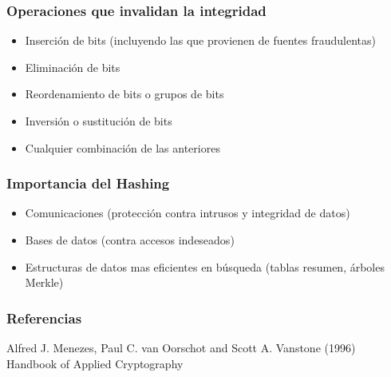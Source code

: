 \documentclass{beamer}
\begin{document}

\begin{frame}
\frametitle{Operaciones que invalidan la integridad}
\begin{itemize}
\item Inserción de bits (incluyendo las que provienen de fuentes fraudulentas)
\item Eliminación de bits
\item Reordenamiento de bits o grupos de bits
\item Inversión o sustitución de bits
\item Cualquier combinación de las anteriores
\end{itemize}
\end{frame}


\begin{frame}
\frametitle{Importancia del Hashing}
\begin{itemize}
\item Comunicaciones (protección contra intrusos y integridad de datos)
\item Bases de datos (contra accesos indeseados)
\item Estructuras de datos mas eficientes en búsqueda (tablas resumen, árboles Merkle)
\end{itemize}
\end{frame}


\begin{frame}
\frametitle{Referencias}
\footnotesize{
\begin{thebibliography}{99} %
 Alfred J. Menezes, Paul C. van Oorschot and Scott A. Vanstone (1996)
\newblock Handbook of Applied Cryptography
\end{thebibliography}
}
\end{frame}

\end{document}
